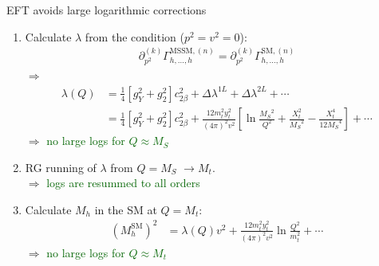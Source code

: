\documentclass[hyperref={pdfpagelabels=false},ngerman]{beamer}
\newcommand{\MS}{\ensuremath{M_S}}
\newcommand{\SM}{\ensuremath{\text{SM}}}
\newcommand{\MSSM}{\ensuremath{\text{MSSM}}}
\begin{document}
\begin{frame}{EFT avoids large logarithmic corrections}
  \begin{enumerate}
  \item Calculate $\lambda$ from the condition ($p^2 = v^2 = 0$):
    \begin{align*}
      \partial_{p^2}^{(k)}\Gamma_{h,\ldots,h}^{\MSSM,(n)}
      = \partial_{p^2}^{(k)}\Gamma_{h,\ldots,h}^{\SM,(n)}
    \end{align*}
    $\Rightarrow$
    \begin{align*}
      \lambda(Q) &= \frac{1}{4}\left[g_Y^{2} + g_2^2\right] c^2_{2\beta}
                   + \Delta \lambda^{1L} + \Delta \lambda^{2L} + \cdots \\
                 &= \frac{1}{4}\left[g_Y^{2} + g_2^2\right] c^2_{2\beta}
      + \frac{12 m_t^2 y_t^2}{(4\pi)^2 v^2} \left[
        \ln\frac{\MS^2}{Q^2} + \frac{X_t^2}{\MS^2} - \frac{X_t^4}{12 \MS^4}
      \right]
      + \cdots
    \end{align*}
    $\Rightarrow$ \textcolor{darkgreen}{no large logs for $Q\approx\MS$}
  \item RG running of $\lambda$ from $Q = \MS$ $\rightarrow M_t$.\\
    $\Rightarrow$ \textcolor{darkgreen}{logs are resummed to all orders}
  \item Calculate $M_h$ in the SM at $Q = M_t$:
    \begin{align*}
      (M_h^\SM)^2 &= \lambda(Q) v^2 + \frac{12 m_t^2 y_t^2}{(4\pi)^2 v^2} \ln\frac{Q^2}{m_t^2} + \cdots
    \end{align*}
    $\Rightarrow$ \textcolor{darkgreen}{no large logs for $Q\approx M_t$}
  \end{enumerate}
\end{frame}
\end{document}
